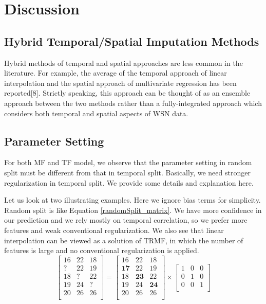 \section{Discussion}  \label{sec:disc}

\subsection{Hybrid Temporal/Spatial Imputation Methods}

Hybrid methods of temporal and spatial approaches are less common in the literature.
For example, the average of the temporal approach of linear interpolation and the spatial approach of multivariate regression has been reported[8].
Strictly speaking, this approach can be thought of as an ensemble approach between the two methods rather than a fully-integrated approach which considers both temporal and spatial aspects of WSN data.

\subsection{Parameter Setting} \label{subsec:parameter}

For both MF and TF model, we observe that the parameter setting in random split must be different from that in temporal split. Basically, we need stronger regularization in temporal split.  We provide some details and explanation here. 

Let us look at two illustrating examples.
Here we ignore bias terms for simplicity.
Random split is like Equation \ref{randomSplit_matrix}.
We have more confidence in our prediction and we rely mostly on temporal correlation, so we prefer more features and weak conventional regularization.
We also see that linear interpolation can be viewed as a solution of TRMF, in which the number of features is large and no conventional regularization is applied. 
\begin{equation}
\label{randomSplit_matrix}
\begin{bmatrix}
16 & 22 & 18\\
 ? & 22 & 19\\
18 &  ?	& 22\\
19 & 24 &  ?\\
20 & 26 & 26\\
\end{bmatrix} 
= 
\begin{bmatrix}
16 & 22 & 18\\
\mathbf{17} & 22 & 19\\
18 & \mathbf{23}	& 22\\
19 & 24 & \mathbf{24}\\
20 & 26 & 26\\
\end{bmatrix} 
\times
\begin{bmatrix}
1 & 0 & 0\\
0 & 1 & 0\\
0 & 0 & 1\\
\end{bmatrix} 
\end{equation}

